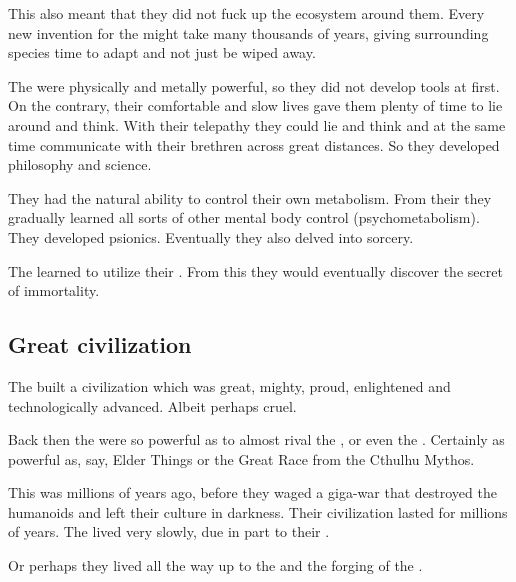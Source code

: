 This also meant that they did not fuck up the ecosystem around them. 
Every new invention for the \ophidians{} might take many thousands of years, giving surrounding species time to adapt and not just be wiped away. 

The \ophidians{} were physically and metally powerful, so they did not develop tools at first. 
On the contrary, their comfortable and slow lives gave them plenty of time to lie around and think. 
With their telepathy they could lie and think and at the same time communicate with their brethren across great distances. 
So they developed philosophy and science. 

They had the natural ability to control their own metabolism. 
From their they gradually learned all sorts of other mental body control (psychometabolism). 
They developed psionics. 
Eventually they also delved into sorcery. 

The \ophidians{} learned to utilize their . 
From this they would eventually discover the secret of immortality. 











\subsection{Great civilization}
The \ophidians{} built a civilization which was great, mighty, proud, enlightened and technologically advanced. 
Albeit perhaps cruel. 

Back then the \ophidians{} were so powerful as to almost rival the \voyagers, or even the \xss. 
Certainly as powerful as, say, Elder Things or the Great Race from the Cthulhu Mythos. 

This was millions of years ago, before they waged a giga-war that destroyed the \ophidian{} humanoids and left their culture in darkness. 
Their civilization lasted for millions of years. 
The \ophidians{} lived very slowly, due in part to their . 

Or perhaps they lived all the way up to the \firstbanewar{} and the forging of the . 




